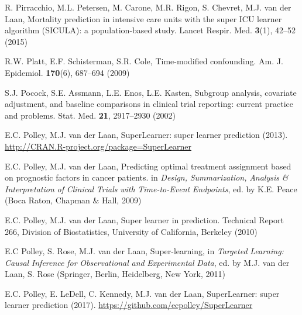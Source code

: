 \begin{list}{}{\setlength{\leftmargin}{2.1em}\setlength{\labelwidth}{0pt}
  \setlength{\labelsep}{0pt}\setlength{\itemindent}{-2.1em}
  \setlength{\parsep}{0pt}\setlength{\itemsep}{2pt}\setlength{\topsep}{0pt}}
\item\label{refentry:REF279}R. Pirracchio, M.L. Petersen, M. Carone, M.R. Rigon, S. Chevret, M.J. van der Laan, Mortality prediction in intensive care units with the super ICU learner algorithm (SICULA): a population-based study. Lancet Respir. Med. \textbf{3}(1), 42--52 (2015)\label{refend:REF279}
\item\label{refentry:REF280}R.W. Platt, E.F. Schisterman, S.R. Cole, Time-modified confounding. Am. J. Epidemiol. \textbf{170}(6), 687--694 (2009)\label{refend:REF280}
\item\label{refentry:REF281}S.J. Pocock, S.E. Assmann, L.E. Enos, L.E. Kasten, Subgroup analysis, covariate adjustment, and baseline comparisons in clinical trial reporting: current practice and problems. Stat. Med. \textbf{21}, 2917--2930 (2002)\label{refend:REF281}
\item\label{refentry:REF282}E.C. Polley, M.J. van der Laan, SuperLearner: super learner prediction (2013). \url{http://CRAN.R-project.org/package=SuperLearner}\label{refend:REF282}
\item\label{refentry:REF283}E.C. Polley, M.J. van der Laan, Predicting optimal treatment assignment based on prognostic factors in cancer patients. in \textit{Design,} \textit{Summarization,} \textit{Analysis} \textit{\&} \textit{Interpretation} \textit{of} \textit{Clinical} \textit{Trials} \textit{with} \textit{Time-to-Event} \textit{Endpoints}, ed. by K.E. Peace (Boca Raton, Chapman \& Hall, 2009)\label{refend:REF283}
\item\label{refentry:REF284}E.C. Polley, M.J. van der Laan, Super learner in prediction. Technical Report 266, Division of Biostatistics, University of California, Berkeley (2010)\label{refend:REF284}
\item\label{refentry:REF285}E.C Polley, S. Rose, M.J. van der Laan, Super-learning, in \textit{Targeted} \textit{Learning:} \textit{Causal} \textit{Inference} \textit{for} \textit{Observational} \textit{and} \textit{Experimental} \textit{Data}, ed. by M.J. van der Laan, S. Rose (Springer, Berlin, Heidelberg, New York, 2011)\label{refend:REF285}
\item\label{refentry:REF286}E.C. Polley, E. LeDell, C. Kennedy, M.J. van der Laan, SuperLearner: super learner prediction (2017). \url{https://github.com/ecpolley/SuperLearner}\label{refend:REF286}

\end{list}

